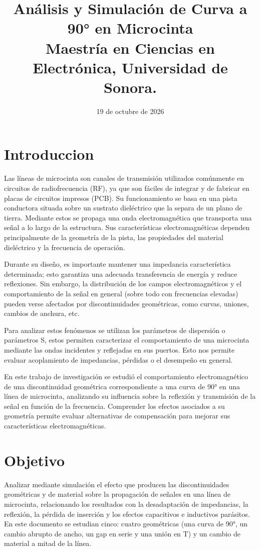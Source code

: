 \documentclass[11pt,letterpaper]{article}
\title{\textbf{Análisis y Simulación de Curva a 90° en Microcinta}\\[6pt]
\small Maestría en Ciencias en Electrónica, Universidad de Sonora.}
\date{19 de octubre de 2026}
\begin{document}
\maketitle

\section{Introduccion}
Las líneas de microcinta son canales de transmisión utilizados comúnmente en circuitos de radiofrecuencia (RF), ya que son fáciles de integrar y de fabricar en placas de circuitos impresos (PCB). Su funcionamiento se basa en una pista conductora situada sobre un sustrato dieléctrico que la separa de un plano de tierra. Mediante estos se propaga una onda electromagnética que transporta una señal a lo largo de la estructura.
Sus características electromagnéticas dependen principalmente de la geometría de la pista, las propiedades del material dieléctrico y la frecuencia de operación.

Durante su diseño, es importante mantener una impedancia característica determinada; esto garantiza una adecuada transferencia de energía y reduce reflexiones. Sin embargo, la distribución de los campos electromagnéticos y el comportamiento de la señal en general (sobre todo con frecuencias elevadas) pueden verse afectados por discontinuidades geométricas, como curvas, uniones, cambios de anchura, etc.

Para analizar estos fenómenos se utilizan los parámetros de dispersión o parámetros S, estos permiten caracterizar el comportamiento de una microcinta mediante las ondas incidentes y reflejadas en sus puertos. Esto nos permite evaluar acoplamiento de impedancias, pérdidas o el desempeño en general.

En este trabajo de investigación se estudió el comportamiento electromagnético de una discontinuidad geométrica correspondiente a una curva de 90° en una línea de microcinta, analizando su influencia sobre la reflexión y transmisión de la señal en función de la frecuencia. Comprender los efectos asociados a su geometría permite evaluar alternativas de compensación para mejorar sus características electromagnéticas.

\section{Objetivo}
Analizar mediante simulación el efecto que producen las discontinuidades geométricas y de material sobre la propagación de señales en una línea de microcinta, relacionando los resultados con la desadaptación de impedancias, la reflexión, la pérdida de inserción y los efectos capacitivos e inductivos parásitos. En este documento se estudian cinco: cuatro geométricas (una curva de \ang{90}, un cambio abrupto de ancho, un gap en serie y una unión en T) y un cambio de material a mitad de la línea.
\end{document}
